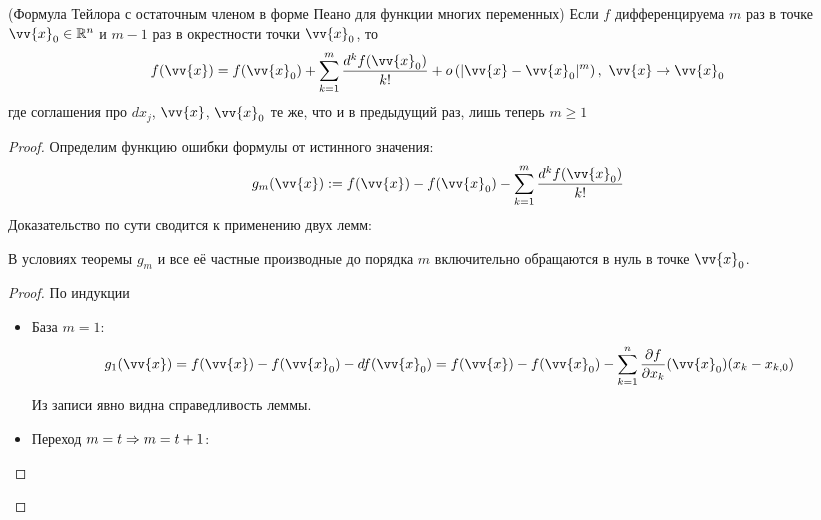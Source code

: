\begin{theorem} (Формула Тейлора с остаточным членом в форме Пеано для функции многих переменных)
	Если $f$ дифференцируема $m$ раз в точке $\vv{x}_0 \in \R^n$ и $m - 1$ раз в окрестности точки $\vv{x}_0$, то
	\[
		f(\vv{x}) = f(\vv{x}_0) + \suml_{k = 1}^m \frac{d^k f(\vv{x}_0)}{k!} + o\left(|\vv{x} - \vv{x}_0|^m\right),\ \vv{x} \to \vv{x}_0
	\]
	где соглашения про $dx_j$, $\vv{x}$, $\vv{x}_0$ те же, что и в предыдущий раз, лишь теперь $m \geq 1$
\end{theorem}

\begin{proof}
	Определим функцию ошибки формулы от истинного значения:
	\[
		g_m(\vv{x}) := f(\vv{x}) - f(\vv{x}_0) - \suml_{k = 1}^m \frac{d^k f(\vv{x}_0)}{k!}
	\]
	Доказательство по сути сводится к применению двух лемм:
	\begin{lemma}
		В условиях теоремы $g_m$ и все её частные производные до порядка $m$ включительно обращаются в нуль в точке $\vv{x}_0$.
	\end{lemma}

	\begin{proof}
		По индукции
		\begin{itemize}
			\item База $m = 1$:
			\[
				g_1(\vv{x}) = f(\vv{x}) - f(\vv{x}_0) - d f(\vv{x}_0) = f(\vv{x}) - f(\vv{x}_0) - \suml_{k = 1}^n \pd{f}{x_k} (\vv{x}_0) (x_k - x_{k, 0})
			\]
			Из записи явно видна справедливость леммы.
			
			\item Переход $m = t \Rightarrow m = t + 1$:
			

\end{itemize}
\end{proof}
\end{proof}
